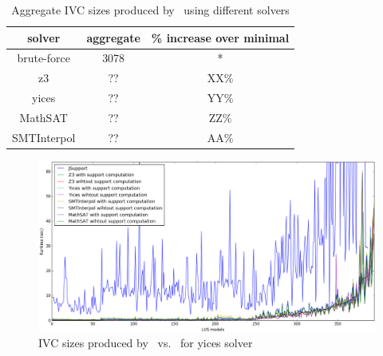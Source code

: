 \begin{table}
  \centering
  \begin{tabular}{ |c|c|c| }
    \hline
     solver & aggregate & \% increase over minimal \\
    \hline
    brute-force & 3078 & * \\
    z3 & ?? & XX\% \\
    yices & ?? & YY\% \\
    MathSAT & ?? & ZZ\% \\
    SMTInterpol & ?? & AA\% \\
    \hline
  \end{tabular}
  \caption{Aggregate IVC sizes produced by \ucalg\ using different solvers}
  \label{tab:minimality-solver}
\end{table}

\begin{figure}
  \centering
  \includegraphics[width=\textwidth]{figs/runtimeAll.png}
  \caption{IVC sizes produced by \ucalg\ vs. \ucbfalg\ for yices solver}
  \label{fig:minimality-all}
\end{figure}

